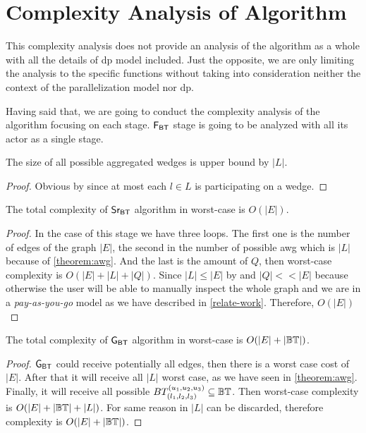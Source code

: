 \clearpage
\section{Complexity Analysis of Algorithm}
This complexity analysis does not provide an analysis of the algorithm as a whole with all the details of \acrshort{dp} model included.
Just the opposite, we are only limiting the analysis to the specific functions without taking into consideration neither the context of the parallelization model nor \acrshort{dp}.

Having said that, we are going to conduct the complexity analysis of the algorithm focusing on each stage. 
$\mathsf{F_{BT}}$ stage is going to be analyzed with all its actor as a single stage.

\begin{theorem}[$|\aw| \leq |L|$]\label{theorem:awg}
The size of all possible aggregated wedges is upper bound by $|L|$.
\end{theorem}
\begin{proof}
Obvious by  since at most each $l \in L$ is participating on a wedge.
\end{proof}

\begin{proposition}\label{prop:comp-src}
The total complexity of $\mathsf{Sr_{BT}}$ algorithm in worst-case is $O(|E|)$.
\end{proposition}
\begin{proof}
In the case of this stage we have three loops. The first one is the number of edges of the graph $|E|$, the second in the number 
of possible \acrshort{awg} which is $|L|$ because of \autoref{theorem:awg}.
And the last is the amount of $Q$, then worst-case complexity is $O(|E| + |L| + |Q|)$.
Since $|L| \leq |E|$ by  and $|Q| << |E|$ because otherwise the user will be able to manually inspect the whole graph and we are in a \emph{pay-as-you-go} model
as we have described in \autoref{relate-work}.
Therefore, $O(|E|)$ 
\end{proof}

\begin{proposition}
The total complexity of $\mathsf{G_{BT}}$ algorithm in worst-case is $O(|E| + |\mathbb{BT}|)$.
\end{proposition}
\begin{proof}
$\mathsf{G_{BT}}$ could receive potentially all edges, then there is a worst case cost of $|E|$.
After that it will receive all $|L|$ worst case, as we have seen in \autoref{theorem:awg}.
Finally, it will receive all possible $BT_{(l_1, l_2,l_3)}^{(u_1, u_2, u_3)} \subseteq \mathbb{BT}$. Then worst-case complexity is $O(|E| + |\mathbb{BT}| + |L|)$.
For same reason in  $|L|$ can be discarded, therefore complexity is $O(|E| + |\mathbb{BT}|)$.
\end{proof}

